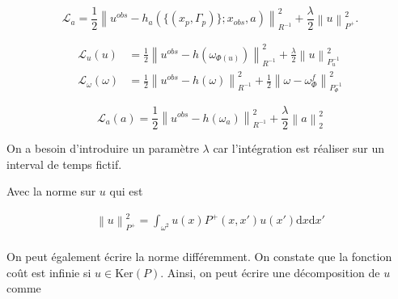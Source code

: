 \documentclass{article}
\newcommand{\norm}[1]{\left\lVert #1 \right\rVert}
\begin{document}
\begin{equation*}
    \mathcal L_a =  \frac12 \norm{u^{obs} - h_a(\{(x_p, \Gamma_p)\}; x_{obs}, a)}^2_{R^{-1}} +  \frac{\lambda}{2} \norm{u}^2_{P^+}.
\end{equation*}

\begin{align*}
    \mathcal L_u(u)           & =  \frac12 \norm{u^{obs} - h(\omega_{\Phi(u)})}^2_{R^{-1}} + \frac{\lambda}{2} \norm{u}^2_{P_u^{-1}}             \\
    \mathcal L_\omega(\omega) & =  \frac12 \norm{u^{obs} - h(\omega)}^2_{R^{-1}} + \frac{1}{2} \norm{\omega - \omega_{\Phi}^f}^2_{P_{\Phi}^{-1}}
\end{align*}

\begin{equation*}
    \mathcal L_a(a)            =  \frac12 \norm{u^{obs} - h(\omega_{a})}^2_{R^{-1}} + \frac{\lambda}{2} \norm{a}^2_2
\end{equation*}

On a besoin d'introduire un paramètre $\lambda$ car l'intégration est réaliser sur un interval de temps fictif.

Avec la norme sur $u$ qui est

\begin{eqnarray*}
    \norm{u}^2_{P^+} = \int_{\omega^2} u(x) P^+(x, x') u(x') \mathrm{d}x\mathrm{d}x' \\
\end{eqnarray*}







On peut également écrire la norme différemment. On constate que la fonction coût est infinie si $u \in \text{Ker} (P)$. Ainsi, on peut écrire une décomposition de $u$ comme
\end{document}
